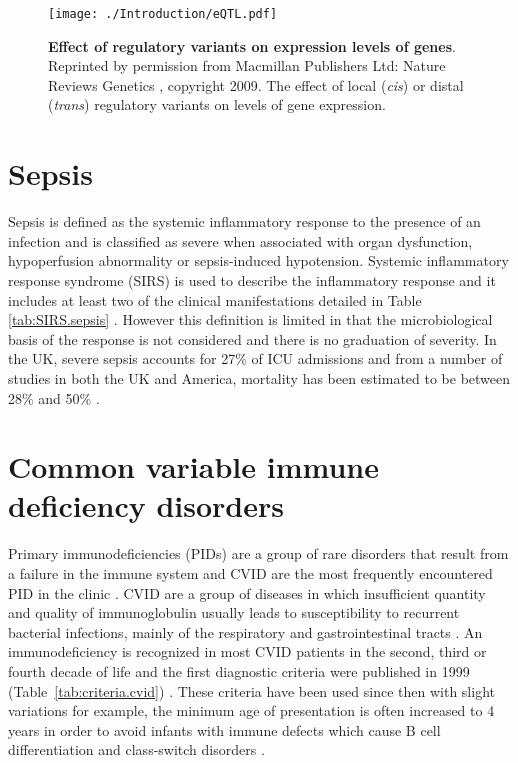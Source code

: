 \begin{figure}[H]
\texttt{[image: ./Introduction/eQTL.pdf]}%
\caption[Effect of regulatory variants on expression levels of genes]{\textbf{Effect of regulatory variants on expression levels of genes}. Reprinted by permission from Macmillan Publishers Ltd: Nature Reviews Genetics \parencite{Cheung2009}, copyright 2009. The effect of local (\textit{cis}) or distal (\textit{trans}) regulatory variants on levels of gene expression.}%
\label{fig:intro.eQTL}%
\end{figure}


\section{Sepsis}
Sepsis is defined as the systemic inflammatory response to the presence of an infection and is classified as severe when associated with organ dysfunction, hypoperfusion abnormality or sepsis-induced hypotension.  Systemic inflammatory response syndrome (SIRS) is used to describe the inflammatory response and it includes at least two of the clinical manifestations detailed in Table \ref{tab:SIRS.sepsis} \parencite{Bone1992}.  However this definition is limited in that the microbiological basis of the response is not considered and there is no graduation of severity.  In the UK, severe sepsis accounts for 27\% of ICU admissions \parencite{Padkin2003} and from a number of studies in both the UK and America, mortality has been estimated to be between 28\% and 50\% \parencite{Angus2001, Padkin2003, Sands1997, Zeni1997}. \\





\section{Common variable immune deficiency disorders}

Primary immunodeficiencies (PIDs) are a group of rare disorders that result from a failure in the immune system and CVID are the most frequently encountered PID in the clinic \parencite{Park2008}. CVID are a group of diseases in which insufficient quantity and quality of immunoglobulin usually leads to susceptibility to recurrent bacterial infections, mainly of the respiratory and gastrointestinal tracts \parencite{Chapel2009}.  An immunodeficiency is recognized in most CVID patients in the second, third or fourth decade of life and the first diagnostic criteria were published in 1999 (Table~\ref{tab:criteria.cvid}) \parencite{Conley1999}.  These criteria have been used since then with slight variations for example, the minimum age of presentation is often increased to 4 years in order to avoid infants with immune defects which cause B cell differentiation and class-switch disorders \parencite{Chapel2008}.

